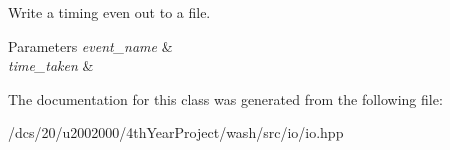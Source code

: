 Write a timing even out to a file. 


\begin{DoxyParams}{Parameters}
{\em event\+\_\+name} & \\
\hline
{\em time\+\_\+taken} & \\
\hline
\end{DoxyParams}


The documentation for this class was generated from the following file\+:\begin{DoxyCompactItemize}
\item 
/dcs/20/u2002000/4th\+Year\+Project/wash/src/io/io.\+hpp\end{DoxyCompactItemize}
